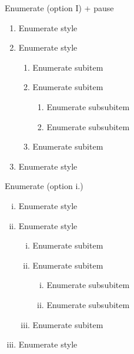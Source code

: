 \documentclass[11pt,t]{beamer}
\begin{document}
	\begin{frame}{Enumerate}
		(option I) + pause
		\begin{enumerate}[I]
			\item Enumerate style
			\item Enumerate style
			\begin{enumerate}[I]
				\item Enumerate subitem
				\item Enumerate subitem
				\pause
				\begin{enumerate}[I]
					\item Enumerate subsubitem
					\item Enumerate subsubitem
				\end{enumerate}
				\pause
				\item Enumerate subitem
			\end{enumerate}
			\item Enumerate style
		\end{enumerate}
	\end{frame}




	\begin{frame}{Enumerate}
		(option i.)
		\begin{enumerate}[i.]
			\item Enumerate style
			\item Enumerate style
			\begin{enumerate}[i.]
				\item Enumerate subitem
				\item Enumerate subitem
				\begin{enumerate}[i.]
					\item Enumerate subsubitem
					\item Enumerate subsubitem
				\end{enumerate}
				\item Enumerate subitem
			\end{enumerate}
			\item Enumerate style
		\end{enumerate}
	\end{frame}
\end{document}
